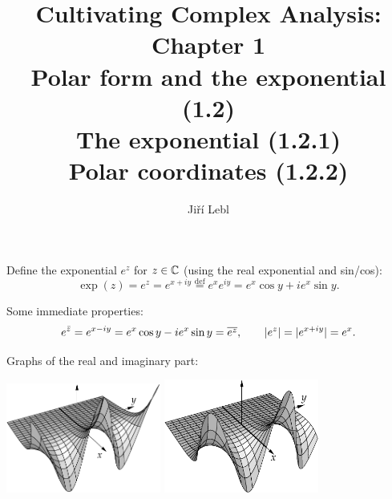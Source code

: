\documentclass[10pt,aspectratio=169]{beamer}
\author{Ji\v{r}\'i Lebl}
\institute[OSU]{%
Departemento pri Matematiko de Oklahoma {\^S}tata Universitato}
\title{Cultivating Complex Analysis: Chapter 1\\%
Polar form and the exponential (1.2)\\%
The exponential (1.2.1)\\%
Polar coordinates (1.2.2)}
\date{}
\begin{document}
\begin{frame}
\titlepage
\end{frame}

\begin{frame}
Define
the exponential $e^z$ for $z \in {\mathbb{C}}$ (using the real exponential and
sin/cos):
\begin{equation*}
\exp(z) =
e^{z} = 
e^{x+iy}
\overset{\text{def}}{=}
e^x e^{iy}
=
e^x\cos y + i e^x \sin y .
\end{equation*}

\medskip
\pause
Some immediate properties:
\begin{equation*}
e^{\bar{z}} = 
e^{x-iy} =
e^x\cos y - i e^x \sin y  = \overline{e^{z}} ,
\qquad
\lvert {e^{z}} \rvert = 
\lvert {e^{x+iy}} \rvert =
e^x .
\end{equation*}

\pause
\medskip

Graphs of the real and imaginary part:

\begin{center}
\includegraphics[width=2.0in]{../figures/realexp}
\qquad
\includegraphics[width=2.0in]{../figures/imagexp}
\end{center}

\end{frame}
\end{document}
